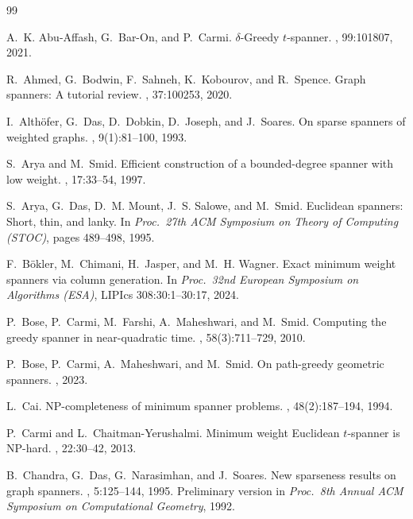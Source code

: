 \documentclass{article}
\begin{document}

\begin{thebibliography}{99}

A.~K. Abu-Affash, G.~Bar-On, and P.~Carmi.
\newblock $\delta$-Greedy $t$-spanner.
, 99:101807, 2021.

R.~Ahmed, G.~Bodwin, F.~Sahneh, K.~Kobourov, and R.~Spence.
\newblock Graph spanners: A tutorial review.
, 37:100253, 2020.

I.~Alth\"ofer, G.~Das, D.~Dobkin, D.~Joseph, and J.~Soares.
\newblock On sparse spanners of weighted graphs.
, 9(1):81--100, 1993.

S.~Arya and M.~Smid.
\newblock Efficient construction of a bounded-degree spanner with low weight.
, 17:33--54, 1997.

S.~Arya, G.~Das, D.~M. Mount, J.~S. Salowe, and M.~Smid.
\newblock Euclidean spanners: Short, thin, and lanky.
\newblock In {\em Proc.\ 27th ACM Symposium on Theory of Computing (STOC)}, pages 489--498, 1995.

F.~B\"okler, M.~Chimani, H.~Jasper, and M.~H. Wagner.
\newblock Exact minimum weight spanners via column generation.
\newblock In {\em Proc.\ 32nd European Symposium on Algorithms (ESA)}, LIPIcs 308:30:1--30:17, 2024.

P.~Bose, P.~Carmi, M.~Farshi, A.~Maheshwari, and M.~Smid.
\newblock Computing the greedy spanner in near-quadratic time.
, 58(3):711--729, 2010.

P.~Bose, P.~Carmi, A.~Maheshwari, and M.~Smid.
\newblock On path-greedy geometric spanners.
, 2023.

L.~Cai.
\newblock NP-completeness of minimum spanner problems.
, 48(2):187--194, 1994.

P.~Carmi and L.~Chaitman-Yerushalmi.
\newblock Minimum weight {E}uclidean $t$-spanner is {NP}-hard.
, 22:30--42, 2013.

B.~Chandra, G.~Das, G.~Narasimhan, and J.~Soares.
\newblock New sparseness results on graph spanners.
, 5:125--144, 1995.
\newblock Preliminary version in {\em Proc.\ 8th Annual ACM Symposium on Computational Geometry}, 1992.


\end{thebibliography}
\end{document}

